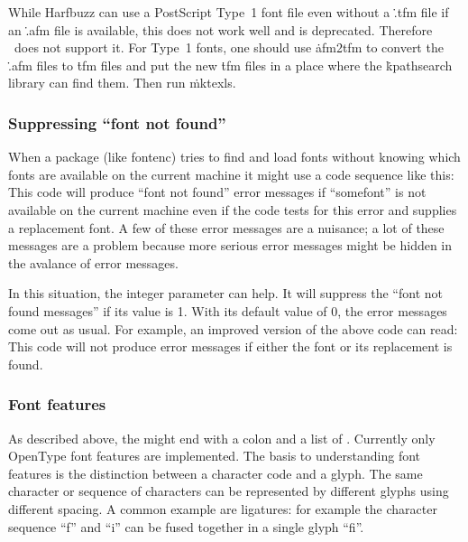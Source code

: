 While Harfbuzz can use a PostScript Type~1 font file even without a \.{.tfm} file
if an  \.{.afm} file is available, this does not work well and is deprecated.
Therefore \HiTeX\ does not support it.
For Type~1 fonts, one should use \.{afm2tfm} to convert the \.{.afm} files to \.{tfm} 
files and put the new \.{tfm} files in a place where the \.{kpathsearch} library
can find them. Then run \.{mktexls}.

\subsubsection{Suppressing ``font not found''}
When a package (like fontenc) tries to find and
load fonts without knowing which fonts are available on the current machine
it might use a code sequence like this:
\medskip
This code will produce ``font not found'' error messages if ``somefont'' is not available on the
current machine even if the code tests for this error and supplies a replacement font.
A few of these error messages are a nuisance; a lot of these messages are a problem
because more serious error messages might be hidden in the avalance of error messages.

In this situation, the integer parameter  can help.
It will suppress the ``font not found messages''
if its value is 1. With its default value of 0, the error messages come out as usual.
For example, an improved version of the above code can read:
\medskip
This code will not produce error messages if either the font or its replacement is found.

\subsubsection{Font features}
As described above, the  might end with a colon and a list of
. Currently only OpenType font features are implemented.
The basis to understanding font features is the distinction between a character code
and a glyph. The same character or sequence of characters can be represented by
different glyphs using different spacing. A common example are ligatures: for example the
character sequence ``f'' and ``i'' can be fused together in a single glyph ``fi''.

